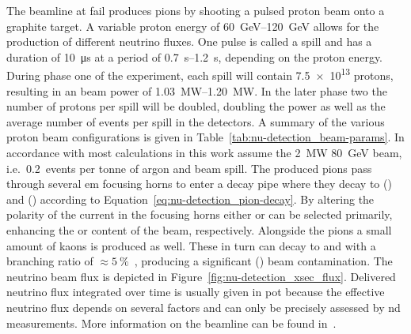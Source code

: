 The beamline at \gls{fail} produces pions by shooting a pulsed proton beam onto a graphite target.
A variable proton energy of \SIrange{60}{120}{\giga\electronvolt} allows for the production of different neutrino fluxes.
One pulse is called a spill and has a duration of \SI{10}{\micro\second} at a period of \SIrange{0.7}{1.2}{\second}, depending on the proton energy.
During phase one of the experiment, each spill will contain \num{7.5e13} protons, resulting in an beam power of \SIrange{1.03}{1.20}{\mega\watt}.
In the later phase two the number of protons per spill will be doubled, doubling the power as well as the average number of events per spill in the detectors.
A summary of the various proton beam configurations is given in Table~\ref{tab:nu-detection_beam-params}.
In accordance with \cite{dune2} most calculations in this work assume the \SI{2}{\mega\watt} \SI{80}{\giga\electronvolt} beam, i.e.\ \num{0.2}~events per tonne of argon and beam spill.
The produced pions pass through several \gls{em} focusing horns to enter a decay pipe where they decay to \Pgmp(\Pgmm) and \Pgngm(\Pagngm) according to Equation~\eqref{eq:nu-detection_pion-decay}.
By altering the polarity of the current in the focusing horns either \Pgpp or \Pgpm can be selected primarily, enhancing the \Pgngm or \Pagngm content of the beam, respectively.
Alongside the pions a small amount of kaons is produced as well.
These in turn can decay to \Pgne and \Pagne with a branching ratio of $\approx\SI{5}{\percent}$~\cite{pdg}, producing a significant \Pgne (\Pagne) beam contamination.
The neutrino beam flux is depicted in Figure~\ref{fig:nu-detection_xsec_flux}.
Delivered neutrino flux integrated over time is usually given in \gls{pot} because the effective neutrino flux depends on several factors and can only be precisely assessed by \gls{nd} measurements.
More information on the beamline can be found in~\cite{dune2}.

